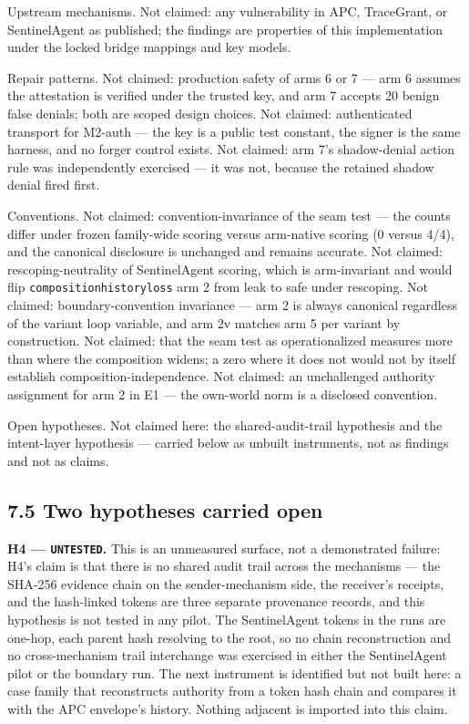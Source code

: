\documentclass[
  10pt,
]{article}
\renewcommand{\_}{\origunderscore\allowbreak}
\begin{document}
Upstream mechanisms. Not claimed: any vulnerability in APC, TraceGrant,
or SentinelAgent as published; the findings are properties of this
implementation under the locked bridge mappings and key models.

Repair patterns. Not claimed: production safety of arms 6 or 7 --- arm 6
assumes the attestation is verified under the trusted key, and arm 7
accepts 20 benign false denials; both are scoped design choices. Not
claimed: authenticated transport for M2-auth --- the key is a public
test constant, the signer is the same harness, and no forger control
exists. Not claimed: arm 7's shadow-denial action rule was independently
exercised --- it was not, because the retained shadow denial fired
first.

Conventions. Not claimed: convention-invariance of the seam test --- the
counts differ under frozen family-wide scoring versus arm-native scoring
(0 versus 4/4), and the canonical disclosure is unchanged and remains
accurate. Not claimed: rescoping-neutrality of SentinelAgent scoring,
which is arm-invariant and would flip
\texttt{composition\_history\_loss} arm 2 from leak to safe under
rescoping. Not claimed: boundary-convention invariance --- arm 2 is
always canonical regardless of the variant loop variable, and arm 2v
matches arm 5 per variant by construction. Not claimed: that the seam
test as operationalized measures more than where the composition widens;
a zero where it does not would not by itself establish
composition-independence. Not claimed: an unchallenged authority
assignment for arm 2 in E1 --- the own-world norm is a disclosed
convention.

Open hypotheses. Not claimed here: the shared-audit-trail hypothesis and
the intent-layer hypothesis --- carried below as unbuilt instruments,
not as findings and not as claims.

\subsection{7.5 Two hypotheses carried
open}\label{two-hypotheses-carried-open}

\textbf{H4 --- \texttt{UNTESTED}.} This is an unmeasured surface, not a
demonstrated failure: H4's claim is that there is no shared audit trail
across the mechanisms --- the SHA-256 evidence chain on the
sender-mechanism side, the receiver's receipts, and the hash-linked
tokens are three separate provenance records, and this hypothesis is not
tested in any pilot. The SentinelAgent tokens in the runs are one-hop,
each parent hash resolving to the root, so no chain reconstruction and
no cross-mechanism trail interchange was exercised in either the
SentinelAgent pilot or the boundary run. The next instrument is
identified but not built here: a case family that reconstructs authority
from a token hash chain and compares it with the APC envelope's history.
Nothing adjacent is imported into this claim.
\end{document}
